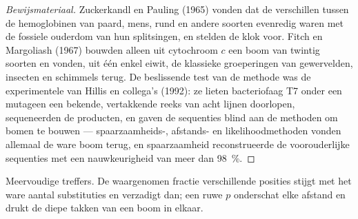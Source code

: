 \begin{proof}[Bewijsmateriaal]
Zuckerkandl en Pauling (1965) vonden dat de verschillen tussen de hemoglobinen
van paard, mens, rund en andere soorten evenredig waren met de fossiele
ouderdom van hun splitsingen, en stelden de klok voor. Fitch en
Margoliash (1967) bouwden alleen uit cytochroom
$c$ een boom van twintig soorten en vonden, uit één enkel eiwit, de klassieke
groeperingen van gewervelden, insecten en schimmels terug. De beslissende test
van de methode was de experimentele  van Hillis en collega's (1992):
ze lieten bacteriofaag T7 onder een mutageen een bekende, vertakkende reeks van
acht lijnen doorlopen, sequeneerden de producten, en gaven de sequenties blind
aan de methoden om bomen te bouwen --- spaarzaamheids-, afstands- en
likelihoodmethoden vonden allemaal de ware boom terug, en spaarzaamheid
reconstrueerde de voorouderlijke sequenties met een nauwkeurigheid van meer dan
\qty{98}{\%}.
\end{proof}

\begin{omfigure}

{\small Meervoudige treffers. De waargenomen fractie verschillende posities
stijgt met het ware aantal substituties en verzadigt dan; een ruwe $p$
onderschat elke afstand en drukt de diepe takken van een boom in elkaar.}
\end{omfigure}

